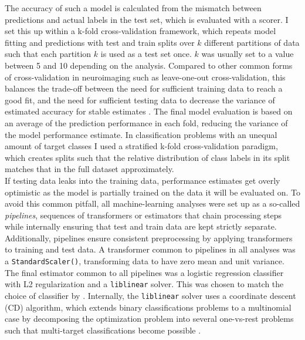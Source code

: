 The accuracy of such a model is calculated from the mismatch between predictions and actual labels in the test set, which is evaluated with a scorer.
I set this up within a k-fold cross-validation framework, which repeats model fitting and predictions with test and train splits over $k$ different partitions of data such that each partition $k$ is used as a test set once.
$k$ was usually set to a value between 5 and 10 depending on the analysis.
Compared to other common forms of cross-validation in neuroimaging such as leave-one-out cross-validation, this balances the trade-off between the need for sufficient training data to reach a good fit, and the need for sufficient testing data to decrease the variance of estimated accuracy for stable estimates \citep{VAROQUAUX2017166}.
The final model evaluation is based on an average of the prediction performance in each fold, reducing the variance of the model performance estimate.
In classification problems with an unequal amount of target classes I used a stratified k-fold cross-validation paradigm, which creates splits such that the relative distribution of class labels in its split matches that in the full dataset approximately.\\
If testing data leaks into the training data, performance estimates get overly optimistic as the model is partially trained on the data it will be evaluated on.
To avoid this common pitfall, all machine-learning analyses were set up as a so-called \textit{pipelines}, sequences of transformers or estimators that chain processing steps while internally ensuring that test and train data are kept strictly separate.
Additionally, pipelines ensure consistent preprocessing by applying transformers to training and test data.
A transformer common to pipelines in all analyses was a \texttt{StandardScaler()}, transforming data to have zero mean and unit variance.
The final estimator common to all pipelines was a logistic regression classifier with L2 regularization and a \texttt{liblinear} solver.
This was chosen to match the choice of classifier by \citet{kaiserposter}.
Internally, the \texttt{liblinear} solver uses a coordinate descent (CD) algorithm, which extends binary classifications problems to a multinomial case by decomposing the optimization problem into several one-vs-rest problems such that multi-target classifications become possible \citep{scikit-learn-liblinear}.\\



